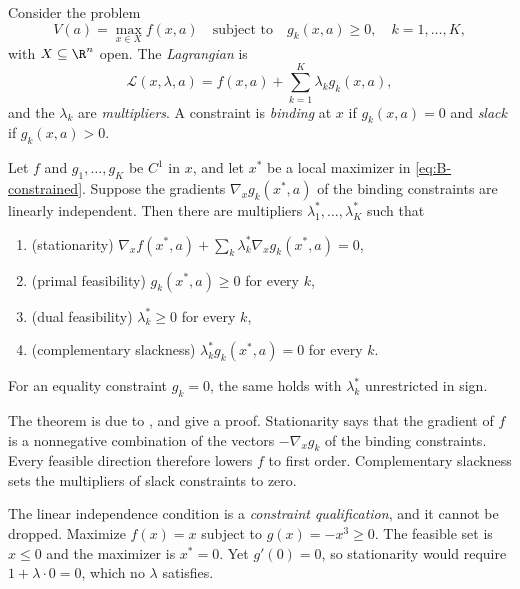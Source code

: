 Consider the problem
\begin{equation}\label{eq:B-constrained}
V(a) = \max_{x \in X} f(x, a) \quad\text{subject to}\quad g_k(x, a) \geq 0 , \quad k = 1, \dots, K ,
\end{equation}
with $X \subseteq \R^n$ open. The \emph{Lagrangian} is
\begin{equation*}
\mathcal{L}(x, \lambda, a) = f(x, a) + \sum_{k = 1}^{K}\lambda_kg_k(x, a) ,
\end{equation*}
and the $\lambda_k$ are \emph{multipliers}. A constraint is \emph{binding} at $x$ if $g_k(x, a) = 0$ and \emph{slack} if
$g_k(x, a) > 0$.

\begin{theorem}\label{thm:B-kkt}
Let $f$ and $g_1, \dots, g_K$ be $C^1$ in $x$, and let $x^*$ be a local maximizer in \eqref{eq:B-constrained}. Suppose the
gradients $\nabla_x g_k(x^*, a)$ of the binding constraints are linearly independent. Then there are multipliers
$\lambda_1^*, \dots, \lambda_K^*$ such that
\begin{enumerate}[label=(\roman*)]
  \item (stationarity) $\nabla_x f(x^*, a) + \sum_k\lambda_k^*\nabla_x g_k(x^*, a) = 0$,
  \item (primal feasibility) $g_k(x^*, a) \geq 0$ for every $k$,
  \item (dual feasibility) $\lambda_k^* \geq 0$ for every $k$,
  \item (complementary slackness) $\lambda_k^*g_k(x^*, a) = 0$ for every $k$.
\end{enumerate}
For an equality constraint $g_k = 0$, the same holds with $\lambda_k^*$ unrestricted in sign.
\end{theorem}

The theorem is due to \citet{KuhnTucker1951}, and \citet[Mathematical Appendix]{MasColellWhinstonGreen1995} give a
proof. Stationarity says that the gradient of $f$ is a nonnegative combination of the vectors $-\nabla_x g_k$ of the
binding constraints. Every feasible direction therefore lowers $f$ to first order. Complementary slackness sets the
multipliers of slack constraints to zero.

The linear independence condition is a \emph{constraint qualification}, and it cannot be dropped. Maximize $f(x) = x$
subject to $g(x) = -x^3 \geq 0$. The feasible set is $x \leq 0$ and the maximizer is $x^* = 0$. Yet $g'(0) = 0$, so
stationarity would require $1 + \lambda\cdot 0 = 0$, which no $\lambda$ satisfies.

